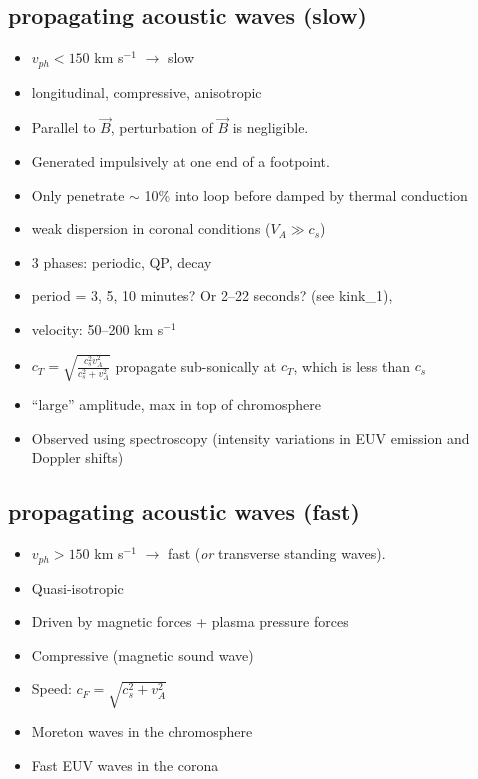 \documentclass[12pt]{article}
\begin{document}
\subsection*{propagating acoustic waves (slow)}
\begin{itemize}
    \item $v_{ph}<150$ km s$^{-1}$ $\rightarrow$ slow
    \item longitudinal, compressive, anisotropic
    \item Parallel to $\vec{B}$, perturbation of $\vec{B}$ is negligible.
    \item Generated impulsively at one end of a footpoint.
    \item Only penetrate $\sim$ 10\% into loop before
        damped by thermal conduction
    \item weak dispersion in coronal conditions ($V_{A} \gg c_{s}$)
    \item 3 phases: periodic, QP, decay
    \item period = 3, 5, 10 minutes? Or 2--22 seconds? (see kink\_1),
    \item velocity: 50--200 km s$^{-1}$
    \item $c_{T} = \sqrt{\frac{c_{s}^2v_{A}^2}{c_{s}^2 + v_{A}^2}} $
        propagate sub-sonically at $c_{T}$, which is less than $c_{s}$
    \item ``large'' amplitude, max in top of chromosphere
    \item Observed using spectroscopy (intensity variations in
        EUV emission  and Doppler shifts)
\end{itemize}

\subsection*{propagating acoustic waves (fast)}
\begin{itemize}
    \item $v_{ph}>150$ km s$^{-1}$ $\rightarrow$ fast
        (\emph{or} transverse standing waves).
    \item Quasi-isotropic
    \item Driven by magnetic forces + plasma pressure forces
    \item Compressive (magnetic sound wave)
    \item Speed: $c_{F} = \sqrt{c_{s}^2 + v_{A}^2} $
    \item Moreton waves in the chromosphere
    \item Fast EUV waves in the corona
\end{itemize}
\end{document}
